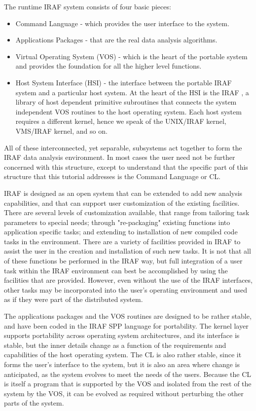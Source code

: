 The runtime IRAF system consists of four basic pieces:

\begin{itemize}
\item Command Language - which provides the user interface to the system.

\item Applications Packages - that are the real data analysis algorithms.

\item Virtual Operating System (VOS) - which is the heart of the portable
system and provides the foundation for all the higher level functions.

\item Host System Interface (HSI) - the interface between the portable IRAF
system and a particular host system.  At the heart of the HSI is the IRAF
, a library of host dependent primitive subroutines that
connects the system independent VOS routines to the host operating system.
Each host system requires a different kernel, hence we speak of the UNIX/IRAF
kernel, VMS/IRAF kernel, and so on.
\end{itemize}

\noindent
All of these interconnected, yet separable, subsystems
act together to form the IRAF data analysis environment.  In
most cases the user need not be further concerned with this structure,
except to understand that the specific part of this structure that
this tutorial addresses is the Command Language or CL.

IRAF is designed as an open system that can be extended to add
new analysis capabilities, and that can support user customization
of the existing facilities.  There are several levels of customization
available, that range from tailoring task parameters to special needs;
through "re-packaging" existing functions into application specific tasks;
and extending to installation of new compiled code tasks in the
environment.  There are a variety of facilities provided in IRAF
to assist the user in the creation and installation of such new tasks.
It is not  
that all of these functions be performed in the IRAF way, but full
integration of a user task within the IRAF environment can best be 
accomplished by using the facilities that are provided.  However,
even without the use of the IRAF interfaces, other tasks may be
incorporated into the user's operating environment and 
used as if they were part of the distributed system.

The applications packages and the VOS routines are designed to be
rather stable, and have been coded in the IRAF SPP language for
portability.  The kernel layer supports portability across
operating system architectures, and its interface is stable, but
the inner details change as a function of the requirements and
capabilities of the host operating system.  The CL is also 
rather stable, since it forms the user's interface to the system,
but it is also an area where change is anticipated, as the system evolves
to meet the needs of the users.  Because the CL is itself a program
that is supported by the VOS and isolated from the rest of the system
by the VOS, it can be evolved as required without perturbing the other
parts of the system.

